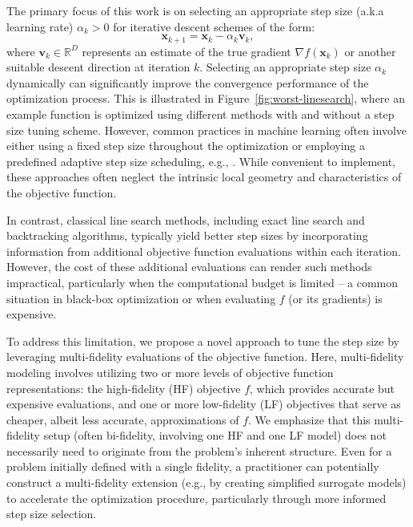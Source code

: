 \documentclass[10pt]{article} %
\numberwithin{equation}{section}
\theoremstyle{plain}
\theoremstyle{definition}
\newcommand{\<}{\langle}
\renewcommand{\>}{\rangle}
\renewcommand{\(}{\left(}
\renewcommand{\)}{\right)}
\renewcommand{\[}{\left[}
\renewcommand{\]}{\right]}
\def\R{{\mathbb R}}
\def\R{{\mathbb R}}
\begin{document}
The primary focus of this work is on selecting an appropriate step size (a.k.a learning rate) $\alpha_k > 0$ for iterative descent schemes of the form:
%
\begin{equation}\label{eq:iterative_scheme}
    \bm x_{k+1} = \bm x_k - \alpha_k \bm v_k,
\end{equation}
%
where $\bm v_k \in \R^D$ represents an estimate of the true gradient $\nabla f(\bm x_k)$ or another suitable descent direction at iteration $k$. Selecting an appropriate step size $\alpha_k$ dynamically can significantly improve the convergence performance of the optimization process. This is illustrated in Figure~\ref{fig:worst-linesearch}, where an example function is optimized using different methods with and without a step size tuning scheme. However, common practices in machine learning often involve either using a fixed step size throughout the optimization or employing a predefined adaptive step size scheduling, e.g., \cite{duchi2011adaptive}. While convenient to implement, these approaches often neglect the intrinsic local geometry and characteristics of the objective function.

In contrast, classical line search methods, including exact line search and backtracking algorithms, typically yield better step sizes by incorporating information from additional objective function evaluations within each iteration. However, the cost of these additional evaluations can render such methods impractical, particularly when the computational budget is limited -- a common situation in black-box optimization or when evaluating 
$f$ (or its gradients) is expensive.

To address this limitation, we propose a novel approach to tune the step size by leveraging multi-fidelity evaluations of the objective function. Here, multi-fidelity modeling involves utilizing two or more levels of objective function representations: the high-fidelity (HF) objective $f$, which provides accurate but expensive evaluations, and one or more low-fidelity (LF) objectives that serve as cheaper, albeit less accurate, approximations of $f$. We emphasize that this multi-fidelity setup (often bi-fidelity, involving one HF and one LF model) does not necessarily need to originate from the problem's inherent structure. Even for a problem initially defined with a single fidelity, a practitioner can potentially construct a multi-fidelity extension (e.g., by creating simplified surrogate models) to accelerate the optimization procedure, particularly through more informed step size selection.
\end{document}
